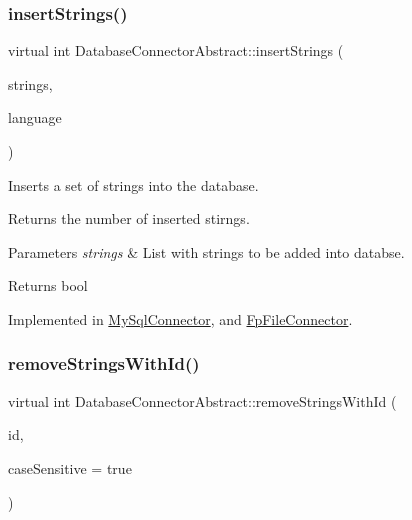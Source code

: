 \mbox{\label{classDatabaseConnectorAbstract_a0e8c94cf0b38c797d6feef864a23347b}} 
\subsubsection{\texorpdfstring{insert\+Strings()}{insertStrings()}}
{\footnotesize\ttfamily virtual int Database\+Connector\+Abstract\+::insert\+Strings (\begin{DoxyParamCaption}\item[{const Q\+List$<$ \mbox{\hyperlink{classString}{String}} $\ast$$>$ \&}]{strings,  }\item[{const Q\+String}]{language }\end{DoxyParamCaption})\hspace{0.3cm}{\ttfamily [pure virtual]}}



Inserts a set of strings into the database. 

Returns the number of inserted stirngs. 
\begin{DoxyParams}{Parameters}
{\em strings} & List with strings to be added into databse. \\
\hline
\end{DoxyParams}
\begin{DoxyReturn}{Returns}
bool 
\end{DoxyReturn}


Implemented in \mbox{\hyperlink{classMySqlConnector_a77a5169dd8a515b613642c88dac9798b}{My\+Sql\+Connector}}, and \mbox{\hyperlink{classFpFileConnector_a7f31d3e699ce4c489c2303370d032a7e}{Fp\+File\+Connector}}.

\mbox{\label{classDatabaseConnectorAbstract_a8c2b0fa4e37d16c1b1ea1cafec166ca0}} 
\subsubsection{\texorpdfstring{remove\+Strings\+With\+Id()}{removeStringsWithId()}}
{\footnotesize\ttfamily virtual int Database\+Connector\+Abstract\+::remove\+Strings\+With\+Id (\begin{DoxyParamCaption}\item[{const Q\+String \&}]{id,  }\item[{bool}]{case\+Sensitive = {\ttfamily true} }\end{DoxyParamCaption})\hspace{0.3cm}{\ttfamily [pure virtual]}}



